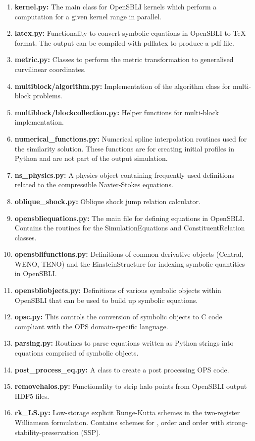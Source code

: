 \documentclass[11pt]{article}
\begin{document}
\begin{enumerate}
	\item{\textbf{kernel.py:} The main class for OpenSBLI kernels which perform a computation for a given kernel range in parallel.}
	\item{\textbf{latex.py:} Functionality to convert symbolic equations in OpenSBLI to TeX format. The output can be compiled with pdflatex to produce a pdf file.}
	\item{\textbf{metric.py:} Classes to perform the metric transformation to generalised curvilinear coordinates.}
  \item{\textbf{multiblock/algorithm.py:} Implementation of the algorithm class for multi-block problems.}
  \item{\textbf{multiblock/blockcollection.py:} Helper functions for multi-block implementation.}
	\item{\textbf{numerical\_functions.py:} Numerical spline interpolation routines used for the similarity solution. These functions are for creating initial profiles in Python and are not part of the output simulation.}	
	\item{\textbf{ns\_physics.py:} A physics object containing frequently used definitions related to the compressible Navier-Stokes equations.}
	\item{\textbf{oblique\_shock.py:} Oblique shock jump relation calculator.}		
	\item{\textbf{opensbliequations.py:} The main file for defining equations in OpenSBLI. Contains the routines for the SimulationEquations and ConstituentRelation classes.}
	\item{\textbf{opensblifunctions.py:} Definitions of common derivative objects (Central, WENO, TENO) and the EinsteinStructure for indexing symbolic quantities in OpenSBLI.}
	\item{\textbf{opensbliobjects.py:} Definitions of various symbolic objects within OpenSBLI that can be used to build up symbolic equations.}
	\item{\textbf{opsc.py:} This controls the conversion of symbolic objects to C code compliant with the OPS domain-specific language.}	
	\item{\textbf{parsing.py:} Routines to parse equations written as Python strings into equations comprised of symbolic objects.}	
	\item{\textbf{post\_process\_eq.py:} A class to create a post processing OPS code.}
	\item{\textbf{removehalos.py:} Functionality to strip halo points from OpenSBLI output HDF5 files.}	
	\item{\textbf{rk\_LS.py:} Low-storage explicit Runge-Kutta schemes in the two-register Williamson formulation. Contains schemes for ,  order and  order with strong-stability-preservation (SSP).}

\end{enumerate}
\end{document}
